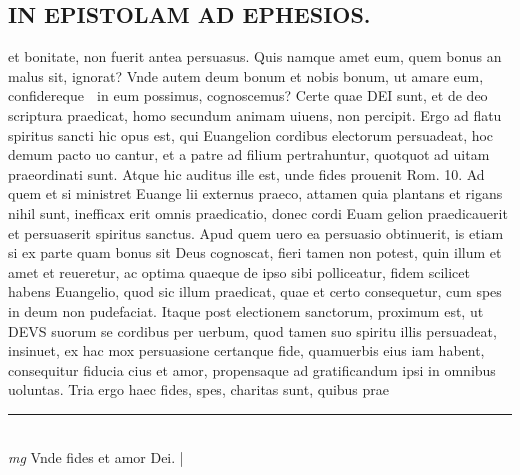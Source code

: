 \documentclass{article}
\begin{document}
\begin{pages}
\section*{IN EPISTOLAM AD EPHESIOS.  }\pstart et bonitate, non fuerit antea persuasus. Quis namque amet eum, quem bonus an malus sit, ignorat? Vnde autem deum bonum et nobis bonum, ut amare eum, confidereque  in eum possimus, cognoscemus? Certe quae DEI sunt, et de deo scriptura praedicat, homo secundum animam uiuens, non percipit.   \pend\pstart Ergo ad flatu spiritus sancti hic opus est, qui Euangelion cordibus electorum persuadeat, hoc demum pacto uo cantur, et a patre ad filium pertrahuntur, quotquot ad uitam praeordinati sunt.  Atque hic auditus ille est, unde fides prouenit Rom. 10.  Ad quem et si ministret Euange lii externus praeco, attamen quia plantans et rigans nihil sunt, inefficax erit omnis praedicatio, donec cordi Euam gelion praedicauerit et persuaserit spiritus sanctus.  Apud quem uero ea persuasio obtinuerit, is etiam si ex parte quam bonus sit Deus cognoscat, fieri tamen non potest, quin illum et amet et reueretur, ac optima quaeque de ipso sibi polliceatur, fidem scilicet habens Euangelio, quod sic illum praedicat, quae et certo consequetur, cum spes in deum non pudefaciat.  Itaque post electionem sanctorum, proximum est, ut DEVS suorum se cordibus per uerbum, quod tamen suo spiritu illis persuadeat, insinuet, ex hac mox persuasione certanque fide, quamuerbis eius iam habent, consequitur fiducia cius et amor, propensaque  ad gratificandum ipsi in omnibus uoluntas.   \pend\pstart Tria ergo haec fides, spes, charitas sunt, quibus prae\pend
\vspace{0.5cm}\noindent
\vspace{0.2cm}\rule{1cm}{0.2pt}\\ 
\hspace{0.2cm}\textit{mg}
\footnotesize Vnde fides et amor Dei.  
\normalsize| 
\endnumbering
\end{pages}
\end{document}
